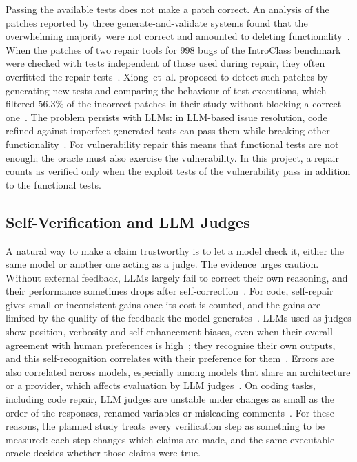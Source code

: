 \documentclass[ai,article,submit,oneauthor]{Definitions/mdpi}
\begin{document}
Passing the available tests does not make a patch correct. An analysis of the patches reported by three generate-and-validate systems found that the overwhelming majority were not correct and amounted to deleting functionality~\cite{Qi2015AnalysisOfPatch}. When the patches of two repair tools for 998 bugs of the IntroClass benchmark were checked with tests independent of those used during repair, they often overfitted the repair tests~\cite{Smith2015IsTheCure}. Xiong~et~al. proposed to detect such patches by generating new tests and comparing the behaviour of test executions, which filtered 56.3\% of the incorrect patches in their study without blocking a correct one~\cite{Xiong2018IdentifyingPatchCorrectness}. The problem persists with LLMs: in LLM-based issue resolution, code refined against imperfect generated tests can pass them while breaking other functionality~\cite{Ahmed2026InvestigatingTestOverfitting}. For vulnerability repair this means that functional tests are not enough; the oracle must also exercise the vulnerability. In this project, a repair counts as verified only when the exploit tests of the vulnerability pass in addition to the functional tests.

\subsection{Self-Verification and LLM Judges}

A natural way to make a claim trustworthy is to let a model check it, either the same model or another one acting as a judge. The evidence urges caution. Without external feedback, LLMs largely fail to correct their own reasoning, and their performance sometimes drops after self-correction~\cite{Huang2024LargeLanguageModels}. For code, self-repair gives small or inconsistent gains once its cost is counted, and the gains are limited by the quality of the feedback the model generates~\cite{Olausson2024IsSelfRepair}. LLMs used as judges show position, verbosity and self-enhancement biases, even when their overall agreement with human preferences is high~\cite{Zheng2023JudgingLlmAs}; they recognise their own outputs, and this self-recognition correlates with their preference for them~\cite{Panickssery2024LlmEvaluatorsRecognize}. Errors are also correlated across models, especially among models that share an architecture or a provider, which affects evaluation by LLM judges~\cite{Kim2025CorrelatedErrorsIn}. On coding tasks, including code repair, LLM judges are unstable under changes as small as the order of the responses, renamed variables or misleading comments~\cite{Jiang2026CodejudgebenchBenchmarkingLlm}. For these reasons, the planned study treats every verification step as something to be measured: each step changes which claims are made, and the same executable oracle decides whether those claims were true.
\end{document}
